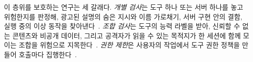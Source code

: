 \documentclass[acmsmall,screen,review,anonymous]{acmart}
\begin{document}
이 층위를 보호하는 연구는 세 갈래다. \emph{개별 검사}는 도구 하나 또는 서버 하나를 놓고 위험한지를 판정해, 광고된 설명의 숨은 지시와 이름 가로채기, 서버 구현 안의 결함, 실행 중의 이상 동작을 찾아낸다~\cite{jain2026detecting, ye2026trustdesc, wang2026mcptox, sun2026viper, tan2026sandscope}. \emph{조합 검사}는 도구의 능력 라벨을 받아, 신뢰할 수 없는 콘텐츠와 비공개 데이터, 그리고 공격자가 읽을 수 있는 목적지가 한 세션에 함께 모이는 조합을 위험으로 지목한다~\cite{willison2025lethal, beurerkellner2025toxicflow, schneider2026securing}. \emph{권한 제한}은 사용자의 작업에서 도구 권한 정책을 만들어 호출마다 집행한다~\cite{shi2025progent, debenedetti2025defeating, costa2025securing}.
\end{document}
